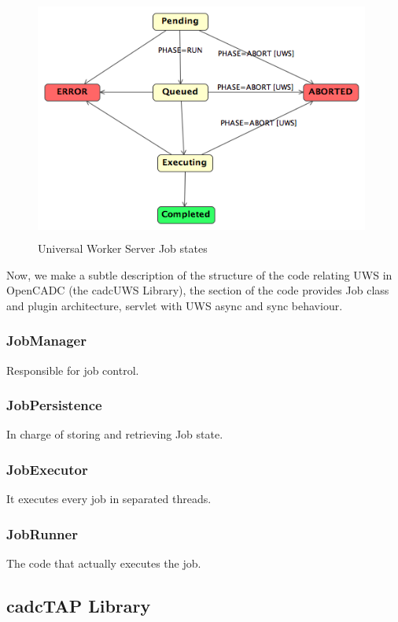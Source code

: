 \begin{figure}[H]
\centering
\includegraphics[width=11cm,height=8cm]{images/UWSStates.png}
\caption{Universal Worker Server Job states}
\end{figure}

Now, we make a subtle description of the structure of the code relating UWS in OpenCADC (the cadcUWS Library), the section of the code provides Job class and plugin architecture, servlet with UWS async and sync behaviour.

\subsubsection{JobManager}

Responsible for job control.

\subsubsection{JobPersistence}

In charge of storing and retrieving Job state.

\subsubsection{JobExecutor}

It executes every job in separated threads.

\subsubsection{JobRunner}

The code that actually executes the job.


\subsection{cadcTAP Library}

